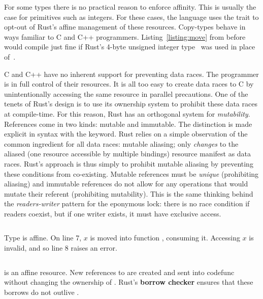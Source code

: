 For some types there is no practical reason to enforce affinity. This is usually the case for primitives such as integers. For these cases, the language uses the  trait to opt-out of Rust's affine management of these resources. Copy-types behave in ways familiar to C and C++ programmers. Listing~\ref{listing:move} from before would compile just fine if Rust's 4-byte unsigned integer type~ was used in place of~.

C and C++ have no inherent support for preventing data races. The programmer is in full control of their resources. It is all too easy to create data races to C by unintentionally accessing the same resource in parallel precautions. One of the tenets of Rust's design is to use its ownership system to prohibit these data races at compile-time. For this reason, Rust has an orthogonal system for \textit{mutability}. References come in two kinds: mutable and immutable. The distinction is made explicit in syntax with the  keyword. Rust relies on a simple observation of the common ingredient for all data races: mutable aliasing; only \textit{changes} to the aliased (one resource accessible by multiple bindings) resource manifest as data races. Rust's approach is thus simply to prohibit mutable aliasing by preventing these conditions from co-existing. Mutable references must be \textit{unique} (prohibiting aliasing) and immutable references do not allow for any operations that would mutate their referent (prohibiting mutability). This is the same thinking behind the \textit{readers-writer} pattern for the eponymous lock: there is no race condition if readers coexist, but if one writer exists, it must have exclusive access. 




\begin{listing}[ht]
	\centering
	\inputminted[]{rust}{move.rs}
	\caption[Example of move semantics in Rust.]{Type  is affine. On line 7, $x$ is moved into function , consuming it. Accessing $x$ is invalid, and so line 8 raises an error.}
	\label{listing:move}
\end{listing}

\begin{listing}[ht]
	\centering
	\inputminted[]{rust}{move2.rs}
	\caption[Example of borrowing in Rust.]{ is an affine resource. New references to  are created and sent into code{func} without changing the ownership of . Rust's \textbf{borrow checker} ensures that these borrows do not outlive .}
	\label{listing:move2}
\end{listing}

